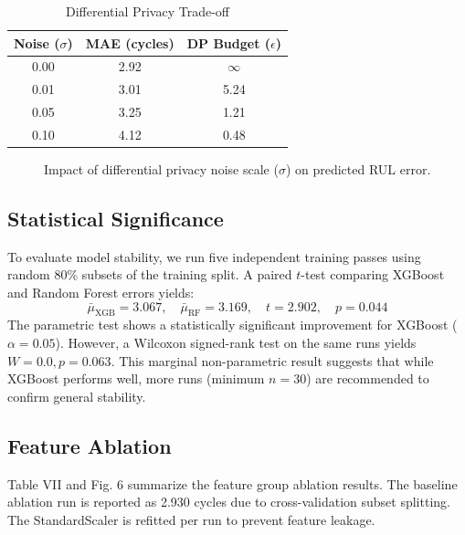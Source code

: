 \documentclass[letterpaper, 10 pt, conference]{ieeeconf}
\begin{document}
\begin{table}[htbp]
\caption{Differential Privacy Trade-off}
\label{tab:dp}
\centering\small
\begin{tabular}{ccc}
\toprule
\textbf{Noise ($\sigma$)} & \textbf{MAE (cycles)} & \textbf{DP Budget ($\epsilon$)} \\
\midrule
0.00 & 2.92 & $\infty$ \\
0.01 & 3.01 & 5.24 \\
0.05 & 3.25 & 1.21 \\
0.10 & 4.12 & 0.48 \\
\bottomrule
\end{tabular}
\end{table}

\begin{figure}[htbp]
\centering
{}
\caption{Impact of differential privacy noise scale ($\sigma$) on predicted RUL error.}
\label{fig:dp_curve}
\end{figure}

\subsection{Statistical Significance}
\label{subsec:stats_sig}
To evaluate model stability, we run five independent training passes using random 80\% subsets of the training split. A paired $t$-test comparing XGBoost and Random Forest errors yields:
\begin{equation}
  \bar{\mu}_{\text{XGB}} = 3.067, \quad \bar{\mu}_{\text{RF}} = 3.169, \quad t = 2.902, \quad p = 0.044
\end{equation}
The parametric test shows a statistically significant improvement for XGBoost ($\alpha=0.05$). However, a Wilcoxon signed-rank test on the same runs yields $W = 0.0, p = 0.063$. This marginal non-parametric result suggests that while XGBoost performs well, more runs (minimum $n=30$) are recommended to confirm general stability.

\subsection{Feature Ablation}
\label{subsec:ablation_stud}
Table VII and Fig. 6 summarize the feature group ablation results. The baseline ablation run is reported as 2.930 cycles due to cross-validation subset splitting. The StandardScaler is refitted per run to prevent feature leakage.
\end{document}
